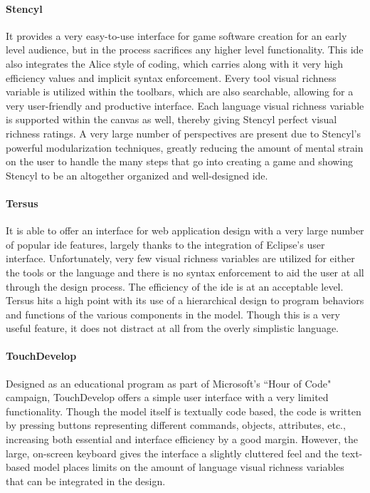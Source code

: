 \paragraph{Stencyl} It provides a very easy-to-use interface for game
software creation for an early level audience, but in the process
sacrifices any higher level functionality. This \ac{ide} also integrates
the Alice style of coding, which carries along with it very high
efficiency values and implicit syntax enforcement. Every tool visual
richness variable is utilized within the toolbars, which are also
searchable, allowing for a very user-friendly and productive interface.
Each language visual richness variable is supported within the canvas as
well, thereby giving Stencyl perfect visual richness ratings. A very large
number of perspectives are present due to Stencyl's powerful modularization
techniques, greatly reducing the amount of mental strain on the user to
handle the many steps that go into creating a game and showing Stencyl to
be an altogether organized and well-designed \ac{ide}.

\paragraph{Tersus} It is able to offer an interface for web application
design with a very large number of popular \ac{ide} features, largely
thanks to the integration of Eclipse's user interface. Unfortunately, very
few visual richness variables are utilized for either the tools or the
language and there is no syntax enforcement to aid the user at all through
the design process. The efficiency of the \ac{ide} is at an acceptable level.
Tersus hits a high point with its use of a hierarchical design to program
behaviors and functions of the various components in the model. Though this
is a very useful feature, it does not distract at all from the overly simplistic language.

\paragraph{TouchDevelop} Designed as an educational program as part of
Microsoft's ``Hour of Code" campaign, TouchDevelop offers a simple user
interface with a very limited functionality. Though the model itself is
textually code based, the code is written by pressing buttons representing
different commands, objects, attributes, etc., increasing both essential
and interface efficiency by a good margin. However, the large, on-screen keyboard
gives the interface a slightly cluttered feel and the text-based
model places limits on the amount of language visual richness variables
that can be integrated in the design.

